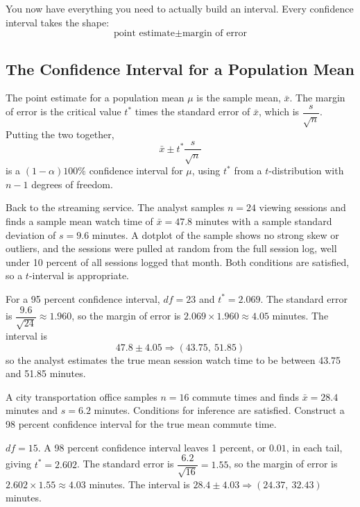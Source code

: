 You now have everything you need to actually build an interval. Every confidence interval takes the shape:
\[
\text{point estimate} \pm \text{margin of error}
\]

\subsection{The Confidence Interval for a Population Mean}
 
The point estimate for a population mean $\mu$ is the sample mean, $\bar{x}$. The margin of error is the critical value $t^*$ times the standard error of $\bar{x}$, which is $\dfrac{s}{\sqrt{n}}$. Putting the two together,
\[
\bar{x} \pm t^* \dfrac{s}{\sqrt{n}}
\]
is a $(1-\alpha)100\%$ confidence interval for $\mu$, using $t^*$ from a $t$-distribution with $n-1$ degrees of freedom.
 
Back to the streaming service. The analyst samples $n = 24$ viewing sessions and finds a sample mean watch time of $\bar{x} = 47.8$ minutes with a sample standard deviation of $s = 9.6$ minutes. A dotplot of the sample shows no strong skew or outliers, and the sessions were pulled at random from the full session log, well under 10 percent of all sessions logged that month. Both conditions are satisfied, so a $t$-interval is appropriate.
 
For a 95 percent confidence interval, $df = 23$ and $t^* = 2.069$. The standard error is $\dfrac{9.6}{\sqrt{24}} \approx 1.960$, so the margin of error is $2.069 \times 1.960 \approx 4.05$ minutes. The interval is
\[
47.8 \pm 4.05 \Rightarrow (43.75,\ 51.85)
\]
so the analyst estimates the true mean session watch time to be between 43.75 and 51.85 minutes.
 
\begin{Exercise}[title={Building a \texorpdfstring{$t$}{t}-Interval}, label={ex:means-ci-build}]
A city transportation office samples $n = 16$ commute times and finds $\bar{x} = 28.4$ minutes and $s = 6.2$ minutes. Conditions for inference are satisfied. Construct a 98 percent confidence interval for the true mean commute time.
\end{Exercise}
 
\begin{Answer}[ref={ex:means-ci-build}]
$df = 15$. A 98 percent confidence interval leaves 1 percent, or $0.01$, in each tail, giving $t^* = 2.602$. The standard error is $\dfrac{6.2}{\sqrt{16}} = 1.55$, so the margin of error is $2.602 \times 1.55 \approx 4.03$ minutes. The interval is $28.4 \pm 4.03 \Rightarrow (24.37,\ 32.43)$ minutes.
\end{Answer}
 
